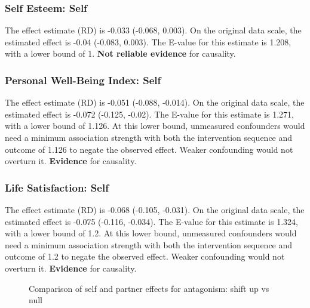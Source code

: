 \documentclass[
  singlecolumn]{article}
\begin{document}
\subsubsection{Self Esteem: Self}\label{self-esteem-self}

The effect estimate (RD) is -0.033 (-0.068, 0.003). On the original data
scale, the estimated effect is -0.04 (-0.083, 0.003). The E-value for
this estimate is 1.208, with a lower bound of 1. \textbf{Not reliable
evidence} for causality.

\subsubsection{Personal Well-Being Index:
Self}\label{personal-well-being-index-self}

The effect estimate (RD) is -0.051 (-0.088, -0.014). On the original
data scale, the estimated effect is -0.072 (-0.125, -0.02). The E-value
for this estimate is 1.271, with a lower bound of 1.126. At this lower
bound, unmeasured confounders would need a minimum association strength
with both the intervention sequence and outcome of 1.126 to negate the
observed effect. Weaker confounding would not overturn it.
\textbf{Evidence} for causality.

\subsubsection{Life Satisfaction: Self}\label{life-satisfaction-self}

The effect estimate (RD) is -0.068 (-0.105, -0.031). On the original
data scale, the estimated effect is -0.075 (-0.116, -0.034). The E-value
for this estimate is 1.324, with a lower bound of 1.2. At this lower
bound, unmeasured confounders would need a minimum association strength
with both the intervention sequence and outcome of 1.2 to negate the
observed effect. Weaker confounding would not overturn it.
\textbf{Evidence} for causality.

\begin{figure}


\caption{\label{fig-results-antagonism-self-partner-up-comparison}Comparison
of self and partner effects for antagonism: shift up vs null}

\end{figure}%
\end{document}
